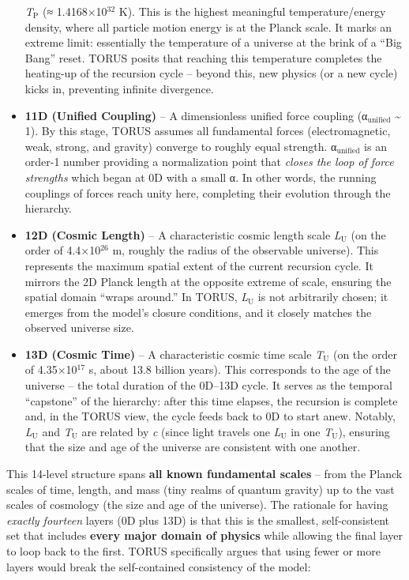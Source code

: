 \documentclass[]{article}
\newcommand{\subscript}[1]{\ensuremath{_{\mathrm{#1}}}}
\newcommand{\superscript}[1]{\ensuremath{^{\mathrm{#1}}}}
\begin{document}
\begin{itemize}
  \emph{T\subscript{P}} (≈
  1.4168×10\superscript{32} K)​. This is the highest meaningful temperature/energy
  density, where all particle motion energy is at the Planck scale. It
  marks an extreme limit: essentially the temperature of a universe at
  the brink of a ``Big Bang'' reset. TORUS posits that reaching this
  temperature completes the heating-up of the recursion cycle​ -- beyond
  this, new physics (or a new cycle) kicks in, preventing infinite
  divergence.
\item
  \textbf{11D (Unified Coupling)} -- A dimensionless unified force
  coupling
  (α\subscript{unified}
  \textasciitilde{} 1)​. By this stage, TORUS assumes all fundamental
  forces (electromagnetic, weak, strong, and gravity) converge to
  roughly equal strength.
  α\subscript{unified} is
  an order-1 number providing a normalization point that \emph{closes
  the loop of force strengths} which began at 0D with a small α. In
  other words, the running couplings of forces reach unity here,
  completing their evolution through the hierarchy​.
\item
  \textbf{12D (Cosmic Length)} -- A characteristic cosmic length scale
  \emph{L\subscript{U}} (on
  the order of 4.4×10\superscript{26} m, roughly the radius of the observable
  universe)​. This represents the maximum spatial extent of the current
  recursion cycle. It mirrors the 2D Planck length at the opposite
  extreme of scale, ensuring the spatial domain ``wraps around.'' In
  TORUS,
  \emph{L\subscript{U}} is
  not arbitrarily chosen; it emerges from the model's closure
  conditions, and it closely matches the observed universe size.
\item
  \textbf{13D (Cosmic Time)} -- A characteristic cosmic time scale
  \emph{T\subscript{U}} (on
  the order of 4.35×10\superscript{17} s, about 13.8 billion years)​. This
  corresponds to the age of the universe -- the total duration of the
  0D--13D cycle. It serves as the temporal ``capstone'' of the
  hierarchy: after this time elapses, the recursion is complete and, in
  the TORUS view, the cycle feeds back to 0D to start anew. Notably,
  \emph{L\subscript{U}} and
  \emph{T\subscript{U}} are
  related by \emph{c} (since light travels one
  \emph{L\subscript{U}} in
  one
  \emph{T\subscript{U}}),
  ensuring that the size and age of the universe are consistent with one
  another​.
\end{itemize}

This 14-level structure spans \textbf{all known fundamental scales} --
from the Planck scales of time, length, and mass (tiny realms of quantum
gravity) up to the vast scales of cosmology (the size and age of the
universe)​. The rationale for having \emph{exactly fourteen} layers (0D
plus 13D) is that this is the smallest, self-consistent set that
includes \textbf{every major domain of physics} while allowing the final
layer to loop back to the first. TORUS specifically argues that using
fewer or more layers would break the self-contained consistency of the
model:
\end{document}
